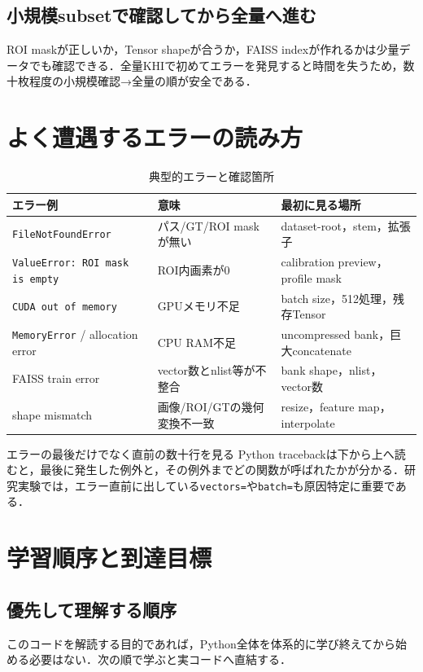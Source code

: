 \documentclass[a4paper,11pt]{ltjsreport}
\begin{document}
\section{小規模subsetで確認してから全量へ進む}
ROI maskが正しいか，Tensor shapeが合うか，FAISS indexが作れるかは少量データでも確認できる．全量KHIで初めてエラーを発見すると時間を失うため，数十枚程度の小規模確認→全量の順が安全である．

\chapter{よく遭遇するエラーの読み方}

\begin{table}[H]
\centering
\caption{典型的エラーと確認箇所}
\begin{tabularx}{\linewidth}{L{43mm} L{43mm} Y}
\toprule
エラー例 & 意味 & 最初に見る場所 \\
\midrule
\texttt{FileNotFoundError} & パス/GT/ROI maskが無い & dataset-root，stem，拡張子 \\
\texttt{ValueError: ROI mask is empty} & ROI内画素が0 & calibration preview，profile mask \\
\texttt{CUDA out of memory} & GPUメモリ不足 & batch size，512処理，残存Tensor \\
\texttt{MemoryError} / allocation error & CPU RAM不足 & uncompressed bank，巨大concatenate \\
FAISS train error & vector数とnlist等が不整合 & bank shape，nlist，vector数 \\
shape mismatch & 画像/ROI/GTの幾何変換不一致 & resize，feature map，interpolate \\
\bottomrule
\end{tabularx}
\end{table}

\begin{pointbox}{エラーの最後だけでなく直前の数十行を見る}
Python tracebackは下から上へ読むと，最後に発生した例外と，その例外までどの関数が呼ばれたかが分かる．研究実験では，エラー直前に出している\texttt{vectors=}や\texttt{batch=}も原因特定に重要である．
\end{pointbox}

\chapter{学習順序と到達目標}

\section{優先して理解する順序}
このコードを解読する目的であれば，Python全体を体系的に学び終えてから始める必要はない．次の順で学ぶと実コードへ直結する．
\end{document}
